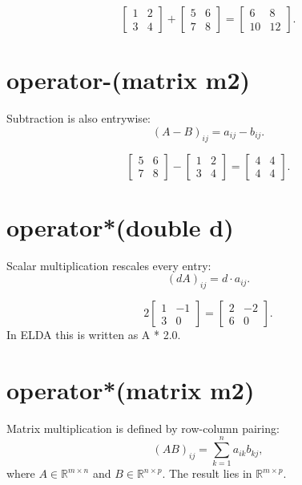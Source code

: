 \documentclass[11pt,a4paper,openany]{book}
\def\code#1{#1}%
\DeclareRobustCommand{\code}[1]{\texttt{\detokenize{#1}}}
\newcommand{\R}{\mathbb{R}}
\begin{document}
\begin{examplebox}[Example]
\[
\begin{bmatrix}
1 & 2 \\
3 & 4
\end{bmatrix}
+
\begin{bmatrix}
5 & 6 \\
7 & 8
\end{bmatrix}
=
\begin{bmatrix}
6 & 8 \\
10 & 12
\end{bmatrix}.
\]
\end{examplebox}

\section{\code{operator-(matrix m2)}}
Subtraction is also entrywise:
\[
(A-B)_{ij} = a_{ij} - b_{ij}.
\]

\begin{examplebox}[Example]
\[
\begin{bmatrix}
5 & 6 \\
7 & 8
\end{bmatrix}
-
\begin{bmatrix}
1 & 2 \\
3 & 4
\end{bmatrix}
=
\begin{bmatrix}
4 & 4 \\
4 & 4
\end{bmatrix}.
\]
\end{examplebox}

\section{\code{operator*(double d)}}
Scalar multiplication rescales every entry:
\[
(dA)_{ij} = d \cdot a_{ij}.
\]

\begin{examplebox}[Example]
\[
2
\begin{bmatrix}
1 & -1 \\
3 & 0
\end{bmatrix}
=
\begin{bmatrix}
2 & -2 \\
6 & 0
\end{bmatrix}.
\]
In ELDA this is written as \code{A * 2.0}.
\end{examplebox}

\section{\code{operator*(matrix m2)}}
Matrix multiplication is defined by row-column pairing:
\[
(AB)_{ij} = \sum_{k=1}^{n} a_{ik} b_{kj},
\]
where \(A \in \R^{m \times n}\) and \(B \in \R^{n \times p}\). The result lies in \(\R^{m \times p}\).
\end{document}
